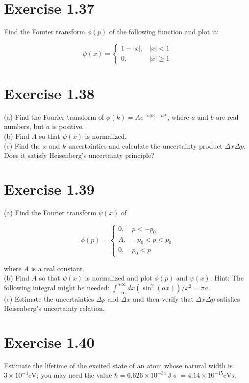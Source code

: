 \documentclass[10pt]{article}
\begin{document}
\section*{Exercise 1.37}
Find the Fourier transform $\phi(p)$ of the following function and plot it:

$$
\psi(x)= \begin{cases}1-|x|, & |x|<1 \\ 0, & |x| \geq 1\end{cases}
$$

\section*{Exercise 1.38}
(a) Find the Fourier transform of $\phi(k)=A e^{-a|k|-i b k}$, where $a$ and $b$ are real numbers, but $a$ is positive.\\
(b) Find $A$ so that $\psi(x)$ is normalized.\\
(c) Find the $x$ and $k$ uncertainties and calculate the uncertainty product $\Delta x \Delta p$. Does it satisfy Heisenberg's uncertainty principle?

\section*{Exercise 1.39}
(a) Find the Fourier transform $\psi(x)$ of

$$
\phi(p)= \begin{cases}0, & p<-p_{0} \\ A, & -p_{0}<p<p_{0} \\ 0, & p_{0}<p\end{cases}
$$

where $A$ is a real constant.\\
(b) Find $A$ so that $\psi(x)$ is normalized and plot $\phi(p)$ and $\psi(x)$. Hint: The following integral might be needed: $\int_{-\infty}^{+\infty} d x\left(\sin ^{2}(a x)\right) / x^{2}=\pi a$.\\
(c) Estimate the uncertainties $\Delta p$ and $\Delta x$ and then verify that $\Delta x \Delta p$ satisfies Heisenberg's uncertainty relation.

\section*{Exercise 1.40}
Estimate the lifetime of the excited state of an atom whose natural width is $3 \times 10^{-4} \mathrm{eV}$; you may need the value $\hbar=6.626 \times 10^{-34} \mathrm{~J}$ s $=4.14 \times 10^{-15} \mathrm{eV} \mathrm{s}$.
\end{document}
